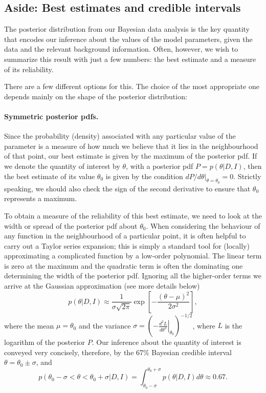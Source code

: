 \documentclass[%
oneside,                 %
final,                   %
10pt]{article}
\begin{document}
\subsection{Aside: Best estimates and credible intervals}
The posterior distribution from our Bayesian data analysis is the key quantity that encodes our inference about the values of the model parameters, given the data and the relevant background information. Often, however, we wish to summarize this result with just a few numbers: the best estimate and a measure of its reliability. 

There are a few different options for this. The choice of the most appropriate one depends mainly on the shape of the posterior distribution:

\paragraph{Symmetric posterior pdfs.}
Since the probability (density) associated with any particular value of the parameter is a measure of how much we believe that it lies in the neighbourhood of that point, our best estimate is given by the maximum of the posterior pdf. If we denote the quantity of interest by $\theta$, with a posterior pdf $P =p(\theta|D,I)$, then the best estimate of its value $\theta_0$ is given by the condition $dP/d\theta|_{\theta=\theta_0}=0$. Strictly speaking, we should also check the sign of the second derivative to ensure that $\theta_0$ represents a maximum.

To obtain a measure of the reliability of this best estimate, we need to look at the width or spread of the posterior pdf about $\theta_0$. When considering the behaviour of any function in the neighbourhood of a particular point, it is often helpful to carry out a Taylor series expansion; this is simply a standard tool for (locally) approximating a complicated function by a low-order polynomial. The linear term is zero at the maximum and the quadratic term is often the dominating one determining the width of the posterior pdf. Ignoring all the higher-order terms we arrive at the Gaussian approximation (see more details below)
\begin{equation}
p(\theta|D,I) \approx \frac{1}{\sigma\sqrt{2\pi}} \exp \left[ -\frac{(\theta-\mu)^2}{2\sigma^2} \right],
\end{equation}
where the mean $\mu = \theta_0$ and the variance $\sigma = \left( - \left. \frac{d^2L}{d\theta^2} \right|_{\theta_0} \right)^{-1/2}$, where $L$ is the logarithm of the posterior $P$. Our inference about the quantity of interest is conveyed very concisely, therefore, by the 67\% Bayesian credible interval $\theta = \theta_0 \pm \sigma$, and 
\[
p(\theta_0-\sigma < \theta < \theta_0+\sigma | D,I) = \int_{\theta_0-\sigma}^{\theta_0+\sigma} p(\theta|D,I) d\theta \approx 0.67.
\]
\end{document}
